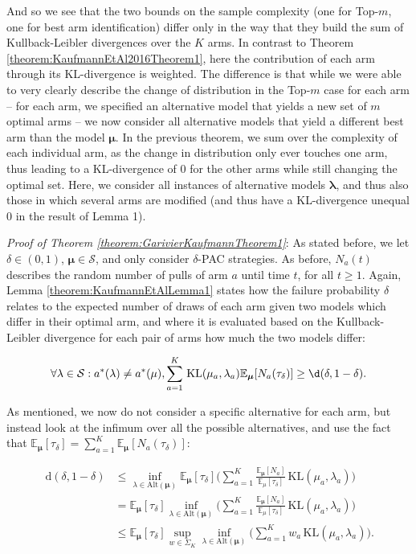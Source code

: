 \documentclass[12pt,]{article}
\newcommand{\KL}{\,\text{KL}}
\newcommand{\der}{\,\text{d}}
\begin{document}
And so we see that the two bounds on the sample complexity (one for
Top-\(m\), one for best arm identification) differ only in the way that
they build the sum of Kullback-Leibler divergences over the \(K\) arms.
In contrast to Theorem \ref{theorem:KaufmannEtAl2016Theorem1}, here the
contribution of each arm through its KL-divergence is weighted. The
difference is that while we were able to very clearly describe the
change of distribution in the Top-\(m\) case for each arm -- for each
arm, we specified an alternative model that yields a new set of \(m\)
optimal arms -- we now consider all alternative models that yield a
different best arm than the model \(\bm{\mu}\). In the previous theorem,
we sum over the complexity of each individual arm, as the change in
distribution only ever touches one arm, thus leading to a KL-divergence
of 0 for the other arms while still changing the optimal set. Here, we
consider all instances of alternative models \(\bm{\lambda}\), and thus
also those in which several arms are modified (and thus have a
KL-divergence unequal 0 in the result of Lemma 1).

\emph{Proof of Theorem \ref{theorem:GarivierKaufmannTheorem1}}: As
stated before, we let \(\delta \in (0,1)\),
\(\bm{\mu} \in \mathcal{S}\), and only consider \(\delta\)-PAC
strategies. As before, \(N_a(t)\) describes the random number of pulls
of arm \(a\) until time \(t\), for all \(t\geq 1\). Again, Lemma
\ref{theorem:KaufmannEtAlLemma1} states how the failure probability
\(\delta\) relates to the expected number of draws of each arm given two
models which differ in their optimal arm, and where it is evaluated
based on the Kullback-Leibler divergence for each pair of arms how much
the two models differ:

\begin{equation*}
\forall \lambda \in \mathcal{S}: a^*(\lambda) \neq a^*(\mu), \sum_{a=1}^K \KL(\mu_a,\lambda_a)\mathbb{E}_{\bm{\mu}}[N_a(\tau_{\delta})] \geq \d(\delta, 1- \delta).
\end{equation*}

As mentioned, we now do not consider a specific alternative for each
arm, but instead look at the infimum over all the possible alternatives,
and use the fact that
\(\mathbb{E}_{\bm{\mu}}[\tau_{\delta}] = \sum_{a=1}^K \mathbb{E}_{\bm{\mu}}[N_a(\tau_{\delta})]\):

\begin{align*}
\der(\delta, 1-\delta) & \leq \inf_{\lambda \in \text{Alt}(\bm{\mu})} \mathbb{E}_{\bm{\mu}}[\tau_{\delta}] \Big(\sum_{a=1}^K \frac{\mathbb{E}_{\bm{\mu}}[N_a]}{\mathbb{E}_{\mu}[\tau_{\delta}]} \KL(\mu_a, \lambda_a)\Big) \\
& = \mathbb{E}_{\bm{\mu}}[\tau_{\delta}] \inf_{\lambda \in \text{Alt}(\bm{\mu})} \Big(\sum_{a=1}^K \frac{\mathbb{E}_{\bm{\mu}}[N_a]}{\mathbb{E}_{\mu}[\tau_{\delta}]} \KL(\mu_a, \lambda_a)\Big) \\
& \leq \mathbb{E}_{\bm{\mu}}[\tau_{\delta}] \sup_{w \in \Sigma_K} \inf_{\lambda \in \text{Alt}(\bm{\mu})} \Big(\sum_{a=1}^K w_a \KL(\mu_a, \lambda_a)\Big).
\end{align*}
\end{document}
